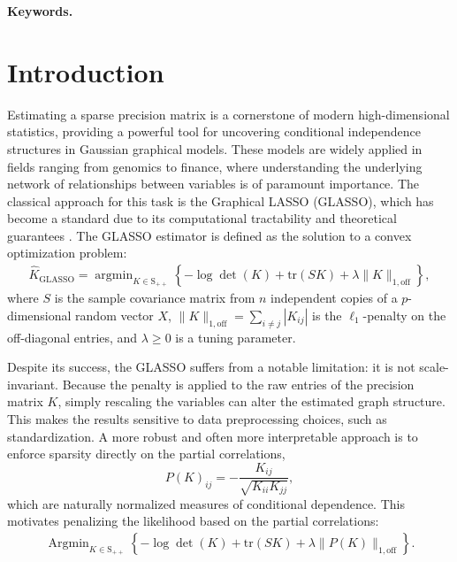 \documentclass[12pt]{amsart}
\numberwithin{equation}{section}
\numberwithin{equation}{section}
\theoremstyle{plain}
\theoremstyle{definition}
\DeclareMathOperator*{\argmin}{\arg\min}
\DeclareMathOperator*{\Argmin}{\mathrm{Arg}\min}
\newcommand{\tr}{\mathrm{tr}}
\newcommand{\Spp}{\mathrm{S}_{++}}
\begin{document}


\maketitle


\noindent \textbf{Keywords.} 


\section{Introduction}\label{sec-intro}

Estimating a sparse precision matrix is a cornerstone of modern high-dimensional statistics, providing a powerful tool for uncovering conditional independence structures in Gaussian graphical models. These models are widely applied in fields ranging from genomics to finance, where understanding the underlying network of relationships between variables is of paramount importance. The classical approach for this task is the Graphical LASSO (GLASSO), which has become a standard due to its computational tractability and theoretical guarantees \cite{friedman2008sparse, YuanLi07}. The GLASSO estimator is defined as the solution to a convex optimization problem:
\begin{align}\label{eq:glasso}
\hat{K}_{\mathrm{GLASSO}} = \argmin_{K\in\Spp} \left\{-\log\det(K)+\tr(S K) + \lambda \|K\|_{1,\mathrm{off}}\right\},
\end{align}
where $S$ is the sample covariance matrix from $n$ independent copies of a $p$-dimensional random vector $X$, $\|K\|_{1,\mathrm{off}} = \sum_{i\neq j} |K_{ij}|$
is the $\ell_1$-penalty on the off-diagonal entries, and $\lambda\geq 0$ is a tuning parameter.

Despite its success, the GLASSO suffers from a notable limitation: it is not scale-invariant. Because the penalty is applied to the raw entries of the precision matrix $K$, simply rescaling the variables can alter the estimated graph structure. This makes the results sensitive to data preprocessing choices, such as standardization. A more robust and often more interpretable approach is to enforce sparsity directly on the partial correlations,
\[        
P(K)_{ij}=-\frac{K_{ij}}{\sqrt{K_{ii}K_{jj}}},
\]
which are naturally normalized measures of conditional dependence. This motivates penalizing the likelihood based on the partial correlations:
\begin{align}\label{eq:pcg0}
\Argmin_{K\in\Spp} \left\{ -\log\det(K) + \tr(SK) + \lambda\| P(K)\|_{1,\mathrm{off}} \right\}.
\end{align}
\end{document}
